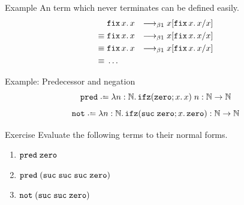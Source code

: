 \begin{frame}{Example}
  An term which never terminates can be defined easily.
  \begin{align*}
             & \mathtt{fix}\,x.\,x & \longrightarrow_{\beta1} x[{\mathtt{fix}\,x.\,x}/{x}] \\
    \equiv{} & \mathtt{fix}\,x.\,x & \longrightarrow_{\beta1} x[{\mathtt{fix}\,x.\,x}/{x}] \\
    \equiv{} & \mathtt{fix}\,x.\,x & \longrightarrow_{\beta1} x[{\mathtt{fix}\,x.\,x}/{x}] \\
    \equiv{} & \dots
  \end{align*}
\end{frame}

\begin{frame}{Example: Predecessor and negation}
  \[
    \pred \defeq \lambda n : \mathbb{N}.\,\ifz(\zero; x.\, x)\;n : \mathbb{N} \to \mathbb{N}
  \]
  \[
    \mathtt{not} \defeq \lambda n : \mathbb{N}.\, \ifz(\suc\;\zero; x.\, \zero) : \mathbb{N} \to \mathbb{N}
  \]
  \begin{block}{Exercise}
    Evaluate the following terms to their normal forms.
    \begin{enumerate}
      \item $\mathtt{pred}\;\mathtt{zero}$
      \item $\mathtt{pred}\;(\mathtt{suc}\;\mathtt{suc}\;\mathtt{suc}\;\mathtt{zero})$
      \item $\mathtt{not}\;(\mathtt{suc}\;\mathtt{suc}\;\mathtt{zero})$
    \end{enumerate}
    
  \end{block}
\end{frame}

